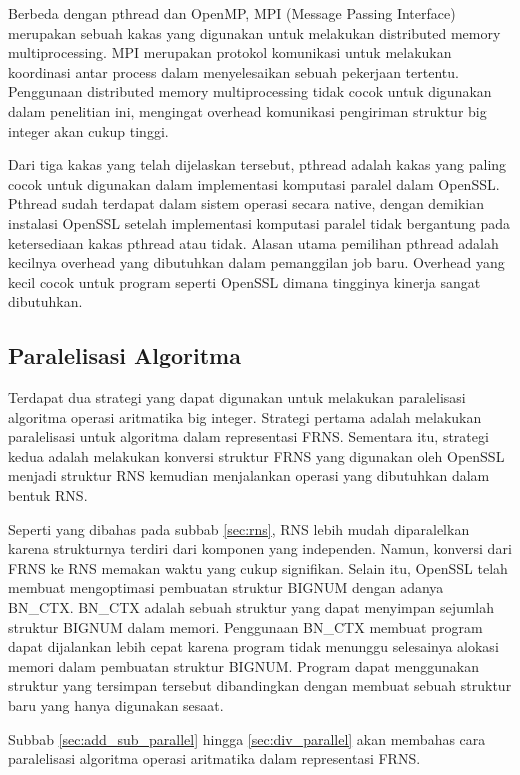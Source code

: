     Berbeda dengan pthread dan OpenMP, MPI (Message Passing Interface) merupakan sebuah kakas yang digunakan untuk melakukan distributed memory multiprocessing. MPI merupakan protokol komunikasi untuk melakukan koordinasi antar process dalam menyelesaikan sebuah pekerjaan tertentu. Penggunaan distributed memory multiprocessing tidak cocok untuk digunakan dalam penelitian ini, mengingat overhead komunikasi pengiriman struktur big integer akan cukup tinggi.

    Dari tiga kakas yang telah dijelaskan tersebut, pthread adalah kakas yang paling cocok untuk digunakan dalam implementasi komputasi paralel dalam OpenSSL. Pthread sudah terdapat dalam sistem operasi secara native, dengan demikian instalasi OpenSSL setelah implementasi komputasi paralel tidak bergantung pada ketersediaan kakas pthread atau tidak. Alasan utama pemilihan pthread adalah kecilnya overhead yang dibutuhkan dalam pemanggilan job baru. Overhead yang kecil cocok untuk program seperti OpenSSL dimana tingginya kinerja sangat dibutuhkan.

  \subsection{Paralelisasi Algoritma} \label{sec:parallelization}
    Terdapat dua strategi yang dapat digunakan untuk melakukan paralelisasi algoritma operasi aritmatika big integer. Strategi pertama adalah melakukan paralelisasi untuk algoritma dalam representasi FRNS. Sementara itu, strategi kedua adalah melakukan konversi struktur FRNS yang digunakan oleh OpenSSL menjadi struktur RNS kemudian menjalankan operasi yang dibutuhkan dalam bentuk RNS.

    Seperti yang dibahas pada subbab \ref{sec:rns}, RNS lebih mudah diparalelkan karena strukturnya terdiri dari komponen yang independen. Namun, konversi dari FRNS ke RNS memakan waktu yang cukup signifikan. Selain itu, OpenSSL telah membuat mengoptimasi pembuatan struktur BIGNUM dengan adanya BN\_CTX. BN\_CTX adalah sebuah struktur yang dapat menyimpan sejumlah struktur BIGNUM dalam memori. Penggunaan BN\_CTX membuat program dapat dijalankan lebih cepat karena program tidak menunggu selesainya alokasi memori dalam pembuatan struktur BIGNUM. Program dapat menggunakan struktur yang tersimpan tersebut dibandingkan dengan membuat sebuah struktur baru yang hanya digunakan sesaat.

    Subbab \ref{sec:add_sub_parallel} hingga \ref{sec:div_parallel} akan membahas cara paralelisasi algoritma operasi aritmatika dalam representasi FRNS.

